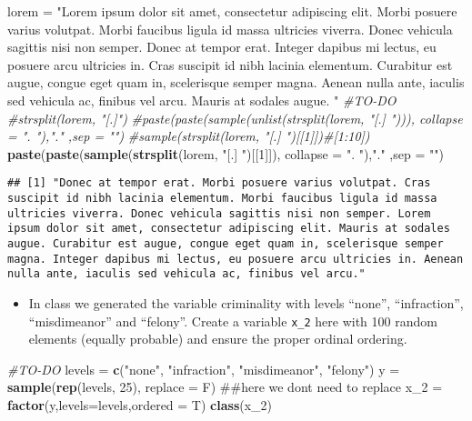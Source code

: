 \documentclass[]{article}
\newenvironment{Shaded}{\begin{snugshade}}{\end{snugshade}}
\newcommand{\KeywordTok}[1]{\textcolor[rgb]{0.13,0.29,0.53}{\textbf{#1}}}
\newcommand{\DataTypeTok}[1]{\textcolor[rgb]{0.13,0.29,0.53}{#1}}
\newcommand{\DecValTok}[1]{\textcolor[rgb]{0.00,0.00,0.81}{#1}}
\newcommand{\StringTok}[1]{\textcolor[rgb]{0.31,0.60,0.02}{#1}}
\newcommand{\CommentTok}[1]{\textcolor[rgb]{0.56,0.35,0.01}{\textit{#1}}}
\newcommand{\NormalTok}[1]{#1}
\providecommand{\tightlist}{%
  \setlength{\itemsep}{0pt}\setlength{\parskip}{0pt}}
\begin{document}
\begin{Shaded}
\begin{Highlighting}[]
\NormalTok{lorem =}\StringTok{ "Lorem ipsum dolor sit amet, consectetur adipiscing elit. Morbi posuere varius volutpat. Morbi faucibus ligula id massa ultricies viverra. Donec vehicula sagittis nisi non semper. Donec at tempor erat. Integer dapibus mi lectus, eu posuere arcu ultricies in. Cras suscipit id nibh lacinia elementum. Curabitur est augue, congue eget quam in, scelerisque semper magna. Aenean nulla ante, iaculis sed vehicula ac, finibus vel arcu. Mauris at sodales augue. "}
\CommentTok{#TO-DO}
\CommentTok{#strsplit(lorem, "[.]")}
\CommentTok{#paste(paste(sample(unlist(strsplit(lorem, "[.] "))), collapse = ". "),"." ,sep = "")}
\CommentTok{#sample(strsplit(lorem, "[.] ")[[1]])#[1:10])}
\KeywordTok{paste}\NormalTok{(}\KeywordTok{paste}\NormalTok{(}\KeywordTok{sample}\NormalTok{(}\KeywordTok{strsplit}\NormalTok{(lorem, }\StringTok{"[.] "}\NormalTok{)[[}\DecValTok{1}\NormalTok{]]), }\DataTypeTok{collapse =} \StringTok{". "}\NormalTok{),}\StringTok{"."}\NormalTok{ ,}\DataTypeTok{sep =} \StringTok{""}\NormalTok{)}
\end{Highlighting}
\end{Shaded}

\begin{verbatim}
## [1] "Donec at tempor erat. Morbi posuere varius volutpat. Cras suscipit id nibh lacinia elementum. Morbi faucibus ligula id massa ultricies viverra. Donec vehicula sagittis nisi non semper. Lorem ipsum dolor sit amet, consectetur adipiscing elit. Mauris at sodales augue. Curabitur est augue, congue eget quam in, scelerisque semper magna. Integer dapibus mi lectus, eu posuere arcu ultricies in. Aenean nulla ante, iaculis sed vehicula ac, finibus vel arcu."
\end{verbatim}

\begin{itemize}
\tightlist
\item
  In class we generated the variable criminality with levels ``none'',
  ``infraction'', ``misdimeanor'' and ``felony''. Create a variable
  \texttt{x\_2} here with 100 random elements (equally probable) and
  ensure the proper ordinal ordering.
\end{itemize}

\begin{Shaded}
\begin{Highlighting}[]
\CommentTok{#TO-DO}
\NormalTok{levels =}\StringTok{ }\KeywordTok{c}\NormalTok{(}\StringTok{"none"}\NormalTok{, }\StringTok{"infraction"}\NormalTok{, }\StringTok{"misdimeanor"}\NormalTok{, }\StringTok{"felony"}\NormalTok{)}
\NormalTok{y =}\StringTok{ }\KeywordTok{sample}\NormalTok{(}\KeywordTok{rep}\NormalTok{(levels, }\DecValTok{25}\NormalTok{), }\DataTypeTok{replace =}\NormalTok{ F) ##here we dont need to replace}
\NormalTok{x_}\DecValTok{2}\NormalTok{ =}\StringTok{ }\KeywordTok{factor}\NormalTok{(y,}\DataTypeTok{levels=}\NormalTok{levels,}\DataTypeTok{ordered =}\NormalTok{ T)}
\KeywordTok{class}\NormalTok{(x_}\DecValTok{2}\NormalTok{)}
\end{Highlighting}
\end{Shaded}
\end{document}
